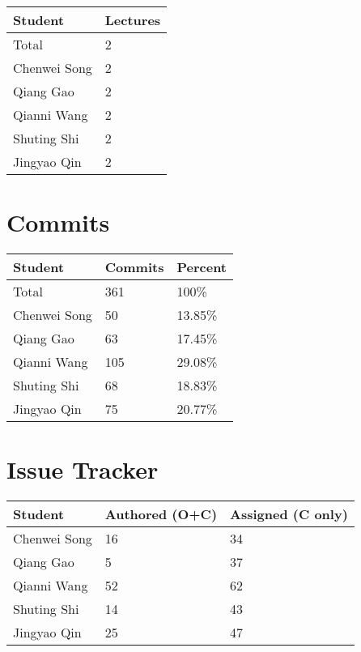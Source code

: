 \documentclass{article}
\begin{document}
\begin{table}[H]
\centering
\begin{tabular}{ll}
\toprule
\textbf{Student} & \textbf{Lectures}\\
\midrule
Total & 2\\
Chenwei Song & 2\\
Qiang Gao & 2\\
Qianni Wang & 2\\
Shuting Shi & 2\\
Jingyao Qin & 2\\
\bottomrule
\end{tabular}
\end{table}


\section{Commits}

\begin{table}[H]
\centering
\begin{tabular}{lll}
\toprule
\textbf{Student} & \textbf{Commits} & \textbf{Percent}\\
\midrule
Total & 361 & 100\% \\
Chenwei Song & 50 & 13.85\%\\
Qiang Gao & 63 & 17.45\%\\
Qianni Wang & 105 & 29.08\%\\
Shuting Shi & 68 & 18.83\%\\
Jingyao Qin & 75 & 20.77\%\\
\bottomrule
\end{tabular}
\end{table}

\section{Issue Tracker}


\begin{table}[H]
\centering
\begin{tabular}{lll}
\toprule
\textbf{Student} & \textbf{Authored (O+C)} & \textbf{Assigned (C only)}\\
\midrule
Chenwei Song & 16 & 34 \\
Qiang Gao & 5 & 37 \\
Qianni Wang & 52 & 62 \\
Shuting Shi & 14 & 43 \\
Jingyao Qin & 25 & 47 \\
\bottomrule
\end{tabular}
\end{table}
\end{document}
